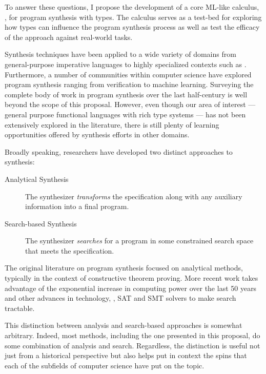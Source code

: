 To answer these questions, I propose the development of a core ML-like calculus,
\lsyn, for program synthesis with types.  The calculus serves as a test-bed for
exploring how types can influence the program synthesis process as well as test
the efficacy of the approach against real-world tasks.

Synthesis techniques have been applied to a wide variety of domains from
general-purpose imperative languages to highly specialized contexts such as
\cite{gupta-popl-2011, ghica-popl-2011, fisher-popl-2008}.  Furthermore, a
number of communities within computer science have explored program synthesis
ranging from verification to machine learning.  Surveying the complete body of
work in program synthesis over the last half-century is well beyond the scope of
this proposal.  However, even though our area of interest --- general purpose
functional languages with rich type systems --- has not been extensively
explored in the literature, there is still plenty of learning opportunities
offered by synthesis efforts in other domains.

Broadly speaking, researchers have developed two distinct approaches to
synthesis:
\begin{description}
\item[Analytical Synthesis] The synthesizer \emph{transforms} the specification
along with any auxiliary information into a final program.
\item[Search-based Synthesis] The synthesizer \emph{searches} for a program in
some constrained search space that meets the specification.
\end{description}
The original literature on program synthesis focused on analytical methods,
typically in the context of constructive theorem proving.  More recent work
takes advantage of the exponential increase in computing power over the last 50
years and other advances in technology, \eg, SAT and SMT solvers
\cite{barrett-smt-2008} to make search tractable.

This distinction between analysis and search-based approaches is somewhat
arbitrary.  Indeed, most methods, including the one presented in this proposal,
do some combination of analysis and search.  Regardless, the distinction is
useful not just from a historical perspective but also helps put in context
the spins that each of the subfields of computer science have put on the
topic.

